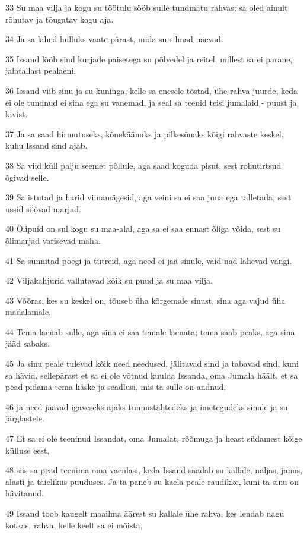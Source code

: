 \par 33 Su maa vilja ja kogu su töötulu sööb sulle tundmatu rahvas; sa oled ainult rõhutav ja tõugatav kogu aja.
\par 34 Ja sa lähed hulluks vaate pärast, mida su silmad näevad.
\par 35 Issand lööb sind kurjade paisetega su põlvedel ja reitel, millest sa ei parane, jalatallast pealaeni.
\par 36 Issand viib sinu ja su kuninga, kelle sa enesele tõstad, ühe rahva juurde, keda ei ole tundnud ei sina ega su vanemad, ja seal sa teenid teisi jumalaid - puust ja kivist.
\par 37 Ja sa saad hirmutuseks, kõnekäänuks ja pilkesõnaks kõigi rahvaste keskel, kuhu Issand sind ajab.
\par 38 Sa viid küll palju seemet põllule, aga saad koguda pisut, sest rohutirtsud õgivad selle.
\par 39 Sa istutad ja harid viinamägesid, aga veini sa ei saa juua ega talletada, sest ussid söövad marjad.
\par 40 Õlipuid on sul kogu su maa-alal, aga sa ei saa ennast õliga võida, sest su õlimarjad varisevad maha.
\par 41 Sa sünnitad poegi ja tütreid, aga need ei jää sinule, vaid nad lähevad vangi.
\par 42 Viljakahjurid vallutavad kõik su puud ja su maa vilja.
\par 43 Võõras, kes su keskel on, tõuseb üha kõrgemale sinust, sina aga vajud üha madalamale.
\par 44 Tema laenab sulle, aga sina ei saa temale laenata; tema saab peaks, aga sina jääd sabaks.
\par 45 Ja sinu peale tulevad kõik need needused, jälitavad sind ja tabavad sind, kuni sa hävid, sellepärast et sa ei ole võtnud kuulda Issanda, oma Jumala häält, et sa pead pidama tema käske ja seadlusi, mis ta sulle on andnud,
\par 46 ja need jäävad igaveseks ajaks tunnustähtedeks ja imetegudeks sinule ja su järglastele.
\par 47 Et sa ei ole teeninud Issandat, oma Jumalat, rõõmuga ja heast südamest kõige külluse eest,
\par 48 siis sa pead teenima oma vaenlasi, keda Issand saadab su kallale, näljas, janus, alasti ja täielikus puuduses. Ja ta paneb su kaela peale raudikke, kuni ta sinu on hävitanud.
\par 49 Issand toob kaugelt maailma äärest su kallale ühe rahva, kes lendab nagu kotkas, rahva, kelle keelt sa ei mõista,
